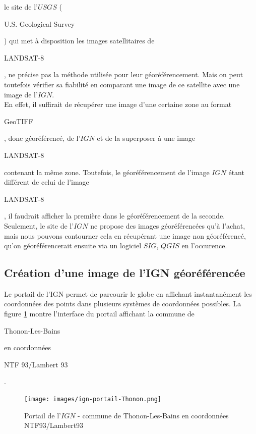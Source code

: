 \documentclass{book}
\begin{document}
le site de l'$USGS$ (\begin{itshape}U.S. Geological Survey\end{itshape}) \cite{landsat8} qui met à disposition les images
satellitaires de \begin{itshape}LANDSAT-8\end{itshape}, ne précise pas la méthode utilisée pour leur géoréférencement.
Mais on peut toutefois vérifier sa fiabilité en comparant une image de ce satellite avec une image de 
l'$IGN$.\\
En effet, il suffirait de récupérer une image d'une certaine zone au format \begin{itshape}GeoTIFF\end{itshape}, 
donc géoréférencé, de l'$IGN$ et de la superposer
à une image \begin{itshape}LANDSAT-8\end{itshape} contenant la même zone. Toutefois, le géoréférencement de l'image $IGN$ étant différent
de celui de l'image \begin{itshape}LANDSAT-8\end{itshape}, il faudrait afficher la première dans le géoréférencement de la seconde.\\
Seulement, le site de l'$IGN$ ne propose des images géoréférencées qu'à l'achat, mais nous pouvons contourner cela en récupérant une 
image non géoréférencé, qu'on géoréférencerait ensuite via un logiciel $SIG$, $QGIS$ en l'occurence.\\

\subsection{Création d'une image de l'IGN géoréférencée}

Le portail de l'IGN \cite{ign-portail} permet de parcourir le globe en affichant instantanément les coordonnées des points dans 
plusieurs systèmes de coordonnées possibles. La figure \ref{ign-portail} montre l'interface du portail affichant la commune de
\begin{itshape}Thonon-Les-Bains\end{itshape} en coordonnées \begin{itshape}NTF 93/Lambert 93\end{itshape}.

\begin{figure}[H]
\begin{center}
\texttt{[image: images/ign-portail-Thonon.png]}
\end{center}
\caption{Portail de l'$IGN$ - commune de Thonon-Les-Bains en coordonnées NTF93/Lambert93 \cite{ign-portail}}
\label{ign-portail}
\end{figure}
\end{document}
